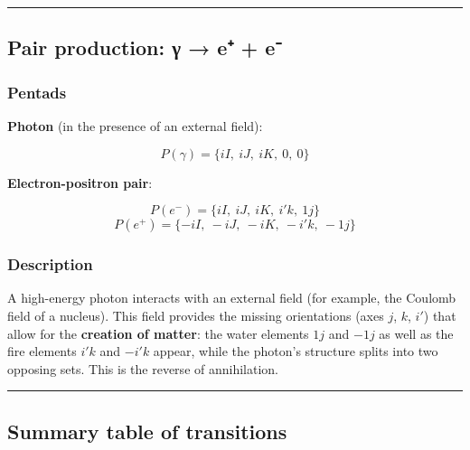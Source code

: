 \documentclass[11pt]{article}
\begin{document}
\begin{center}\rule{0.5\linewidth}{0.5pt}\end{center}

\hypertarget{pair-production-ux3b3-e-e}{%
\subsection{Pair production: γ → e⁺ +
e⁻}\label{pair-production-ux3b3-e-e}}

\hypertarget{pentads-3}{%
\subsubsection{Pentads}\label{pentads-3}}

\textbf{Photon} (in the presence of an external field):

\[
P(\gamma) = \{ iI,\ iJ,\ iK,\ 0,\ 0 \}
\]

\textbf{Electron-positron pair}:

\[
P(e^-) = \{ iI,\ iJ,\ iK,\ i'k,\ 1j \}
\] \[
P(e^+) = \{ -iI,\ -iJ,\ -iK,\ -i'k,\ -1j \}
\]

\hypertarget{description-3}{%
\subsubsection{Description}\label{description-3}}

A high-energy photon interacts with an external field (for example, the
Coulomb field of a nucleus). This field provides the missing
orientations (axes \(j\), \(k\), \(i'\)) that allow for the
\textbf{creation of matter}: the water elements \(1j\) and \(-1j\) as
well as the fire elements \(i'k\) and \(-i'k\) appear, while the
photon's structure splits into two opposing sets. This is the reverse of
annihilation.

\begin{center}\rule{0.5\linewidth}{0.5pt}\end{center}

\hypertarget{summary-table-of-transitions}{%
\subsection{Summary table of
transitions}\label{summary-table-of-transitions}}
\end{document}
